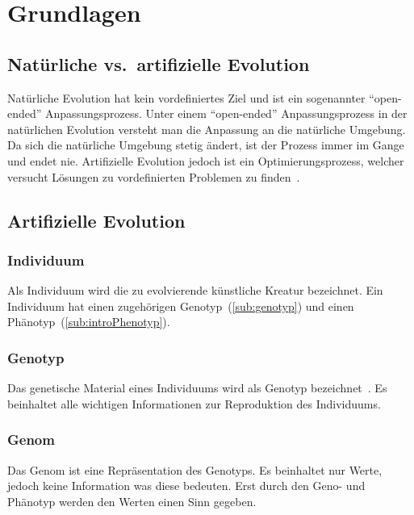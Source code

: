 %
%


\chapter{Grundlagen}

  \section{Natürliche vs.\ artifizielle Evolution}

    Natürliche Evolution hat kein vordefiniertes Ziel und ist ein sogenannter ``open-ended'' Anpassungsprozess.
    Unter einem ``open-ended'' Anpassungsprozess in der natürlichen Evolution
    versteht man die Anpassung an die natürliche Umgebung.
    Da sich die natürliche Umgebung stetig ändert, ist der Prozess immer im Gange und endet nie.
    Artifizielle Evolution jedoch ist ein Optimierungsprozess,
    welcher versucht Lösungen zu vordefinierten Problemen zu finden~\cite[S.1]{book:bioInspired}.

  \section{Artifizielle Evolution}

    \subsection{Individuum\label{sub:individual}}

      Als Individuum wird die zu evolvierende künstliche Kreatur bezeichnet.
      Ein Individuum hat einen zugehörigen Genotyp~(\vref{sub:genotyp}) und einen Phänotyp~(\vref{sub:introPhenotyp}).

    \subsection{Genotyp\label{sub:genotyp}}

      Das genetische Material eines Individuums wird als Genotyp bezeichnet~\cite[S.5]{book:bioInspired}.
      Es beinhaltet alle wichtigen Informationen zur Reproduktion des Individuums.

    \subsection{Genom\label{sub:genom}}

      Das Genom ist eine Repräsentation des Genotyps.
      Es beinhaltet nur Werte, jedoch keine Information was diese bedeuten.
      Erst durch den Geno- und Phänotyp werden den Werten einen Sinn gegeben.

